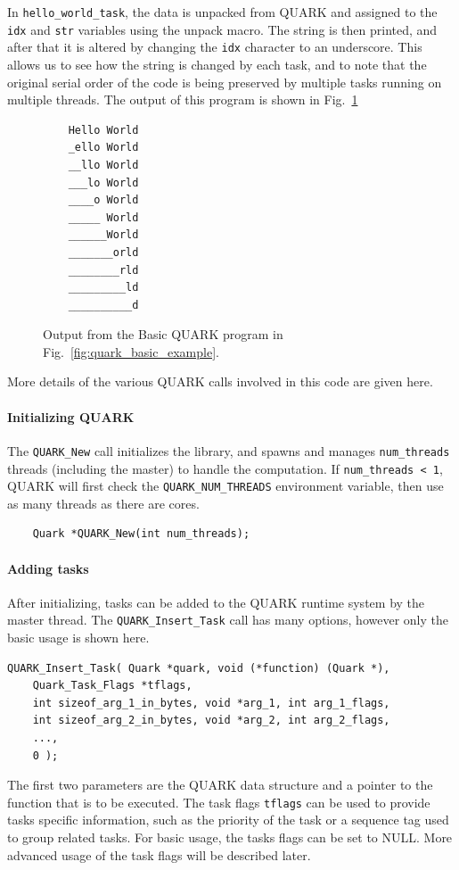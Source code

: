 \documentclass[11pt,letterpaper]{report}
\begin{document}
In \verb|hello_world_task|, the data is unpacked from QUARK and
assigned to the \verb|idx| and \verb|str| variables using the unpack
macro.  The string is then printed, and after that it is altered by
changing the \verb|idx| character to an underscore.  This allows us to
see how the string is changed by each task, and to note that the
original serial order of the code is being preserved by multiple tasks
running on multiple threads.  The output of this program is shown in
Fig.~\ref{fig:quark_basic_example_output}
\begin{figure}[bp]
\centering
\begin{lstlisting}
    Hello World
    _ello World
    __llo World
    ___lo World
    ____o World
    _____ World
    ______World
    _______orld
    ________rld
    _________ld
    __________d
\end{lstlisting}
\caption{Output from the Basic QUARK program in Fig.~\ref{fig:quark_basic_example}. }
\label{fig:quark_basic_example_output}
\end{figure}

More details of the various QUARK calls involved in this code are
given here.
\paragraph{Initializing QUARK}
The \verb|QUARK_New| call initializes the library, and spawns and
manages \verb|num_threads| threads (including the master) to handle
the computation.  If \verb|num_threads < 1|, QUARK will first check
the \verb|QUARK_NUM_THREADS| environment variable, then use as many
threads as there are cores.
\pagebreak[3]
\begin{samepage}
\begin{lstlisting}
    Quark *QUARK_New(int num_threads);
\end{lstlisting}
\end{samepage}
\pagebreak[3]

\paragraph{Adding tasks}
After initializing, tasks can be added to the QUARK runtime system by
the master thread.  The \verb|QUARK_Insert_Task| call has many options,
however only the basic usage is shown here.
\begin{samepage}
\begin{lstlisting}
QUARK_Insert_Task( Quark *quark, void (*function) (Quark *),
    Quark_Task_Flags *tflags,
    int sizeof_arg_1_in_bytes, void *arg_1, int arg_1_flags,
    int sizeof_arg_2_in_bytes, void *arg_2, int arg_2_flags,
    ...,
    0 );
\end{lstlisting}
\end{samepage}
The first two parameters are the QUARK data structure and a pointer to
the function that is to be executed.  The task flags \verb|tflags| can
be used to provide tasks specific information, such as the priority of
the task or a sequence tag used to group related tasks.  For basic
usage, the tasks flags can be set to NULL.  More advanced usage of the
task flags will be described later.
\end{document}

